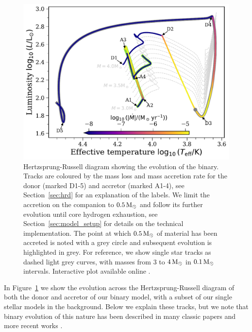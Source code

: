 \documentclass[desactivate]{aa}
\newcommand{\referee}[1]{{#1}}
\begin{document}
\begin{figure}
    \centering
    \includegraphics[width=\columnwidth]{paper/figures/HRD_binary_compromise.pdf}
    \caption{Hertzsprung-Russell diagram showing the evolution of the binary. Tracks are coloured by the mass loss and mass accretion rate for the donor (marked D1-5) and accretor (marked A1-4), see Section~\ref{sec:hrd} for an explanation of the labels. We limit the accretion on the companion to $0.5 \, {\rm M_\odot}$ and follow its further evolution until core hydrogen exhaustion, see Section~\ref{sec:model_setup} for details on the technical implementation. \referee{The point at which $0.5 \, {\rm M_\odot}$ of material has been accreted is noted with a grey circle and subsequent evolution is highlighted in grey.} For reference, we show single star tracks as dashed light grey curves, with masses from $3$ to $4 \, {\rm M_\odot}$ in $0.1 \, {\rm M_\odot}$ intervals. Interactive plot available online \href{www.tomwagg.com/html/interact/mass-gainer-asteroseismology.html\#fig1}{\faChartArea}.}
    \label{fig:hrd}
\end{figure}

In Figure~\ref{fig:hrd} we show the evolution across the Hertzsprung-Russell diagram of both the donor and accretor of our binary model, with a subset of our single stellar models in the background. Below we explain these tracks, but we note that binary evolution of this nature has been described in many classic papers \citep[e.g.][]{Morton+1960:1960ApJ...132..146M, Smak+1962:1962AcA....12...28S, Paczynski+1966:1966AcA....16..231P,Kippenhahn+1969:1969A&A.....3...83K,Yungelson+1973:1973NInfo..27...93Y,vanderLinden+1987:1987A&A...178..170V} and more recent works \citep[e.g.][]{Yoon+2010:2010ApJ...725..940Y,Claeys+2011:2011A&A...528A.131C, Eldridge+2013:2013MNRAS.436..774E, Tauris+2015:2015MNRAS.451.2123T, McClelland+2016:2016MNRAS.459.1505M, Yoon+2017:2017ApJ...840...10Y, Gotberg+2017:2017A&A...608A..11G, Renzo+2021}.
\end{document}
